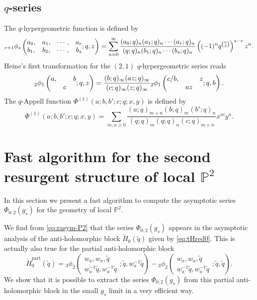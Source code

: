 \documentclass[a4paper,11pt]{article}
\theoremstyle{definition}
\def\IP{{\mathbb P}}
\def\tq{{\tilde{q}}}
\newcommand{\be}{\begin{equation}}
\newcommand{\ee}{\end{equation}}
\newcommand{\wt}[1]{\widetilde{#1}}
\newcommand{\qhg}[6]{{}_#1\phi_{#2}
  \left(\begin{matrix}
    #3  \\
    #4
  \end{matrix} ; #5, #6\right)}
\begin{document}
\subsection{$q$-series}

The $q$-hypergeometric function is defined by 
%
\be
\label{def-qhyper}
{}_{r+1} \phi_{s} \left( \begin{matrix} a_0, & a_1 , & \cdots , & a_r  \\   b_1, & b_2, & \cdots , & b_s  \end{matrix} ; q, z \right)=
\sum_{n =0}^\infty {(a_0;q)_n (a_1;q)_n \cdots (a_r;q)_n \over
(q;q)_n (b_1; q)_n \cdots (b_s;q)_n } \left( (-1)^n q^{{n \choose 2}} \right)^{s-r} z^n. 
\ee
%
Heine's first transformation for the $(2,1)$ $q$-hypergeometric series reads
%
\be
\label{heine}
 {}_2 \phi_{1} \left( \begin{matrix}a,& & b \\ &c& \end{matrix} ; q, z \right)= {(b;q)_\infty (az; q)_\infty \over (c;q)_\infty (z;q)_\infty}  {}_2 \phi_{1} \left( \begin{matrix}c/b,& & z \\ &a z& \end{matrix} ; q, b \right). 
 \ee
The $q$-Appell function $ \Phi^{(1)}(a;b,b';c;q;x,y)$ is defined by 
%
\begin{equation}
\label{def-qappell}
  \Phi^{(1)}(a;b,b';c;q;x,y) = \sum_{m,n\geq 0}
  \frac{(a;q)_{m+n}(b;q)_m(b';q)_n}
  {(q;q)_m(q;q)_n(c;q)_{m+n}}x^my^n.
\end{equation}



\section{Fast algorithm for the second resurgent structure of local $\IP^2$}
\label{sc:fastZ2}

In this section we present a fast algorithm to compute the asymptotic
series $\Phi_{0;2}(g_s)$ for the geometry of local $\IP^2$.

We find from \eqref{eq:rasym-P2} that the series $\Phi_{0;2}(g_s)$
appears in the asymptotic analysis of the anti-holomorphic block
$\wt{H}_0(\tq)$ given by \eqref{eq:tHred0}.
This is actually also true for the partial anti-holomorphic block
\begin{equation}
  \wt{H}^{\text{part}}_0(\tq) =
  \qhg{3}{2}{w_a,w_a,\tq}{w_a^{-1}\tq,w_a^{-1}\tq}{\tq}{w_a^{-1}\tq}
  -\qhg{3}{2}{w_a,w_a,\tq}{w_a^{-1}\tq,w_a^{-1}\tq}{\tq}{\tq}.
\end{equation}
We show that it is possible to extract the series $\Phi_{0;2}(g_s)$
from this partial anti-holomorphic block in the small $g_s$ limit in a
very efficient way.
\end{document}
